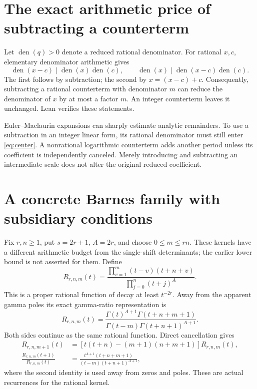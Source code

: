 \documentclass[11pt]{article}
\begin{document}
\section{The exact arithmetic price of subtracting a counterterm}
Let $\operatorname{den}(q)>0$ denote a reduced rational denominator.
For rational $x,c$, elementary denominator arithmetic gives
\begin{equation}
 \operatorname{den}(x-c)\mid\operatorname{den}(x)\operatorname{den}(c),
 \qquad
 \operatorname{den}(x)\mid\operatorname{den}(x-c)\operatorname{den}(c).
 \label{eq:center}
\end{equation}
The first follows by subtraction; the second by $x=(x-c)+c$.
Consequently, subtracting a rational counterterm with denominator $m$
can reduce the denominator of $x$ by at most a factor $m$.
An integer counterterm leaves it unchanged. Lean verifies these statements.

Euler--Maclaurin expansions can sharply estimate analytic remainders.
To use a subtraction in an integer linear form, its rational denominator
must still enter \eqref{eq:center}. A nonrational logarithmic counterterm
adds another period unless its coefficient is independently canceled.
Merely introducing and subtracting an intermediate scale does not alter
the original reduced coefficient.

\section{A concrete Barnes family with subsidiary conditions}
Fix $r,n\ge1$, put $s=2r+1$, $A=2r$, and choose $0\le m\le rn$.
These kernels have a different arithmetic budget from the single-shift
determinants; the earlier lower bound is not asserted for them. Define
\begin{equation}
 R_{r,n,m}(t)=
 \frac{\prod_{v=1}^{m}(t-v)(t+n+v)}
      {\prod_{j=0}^{n}(t+j)^A}.
 \label{eq:kernel}
\end{equation}
This is a proper rational function of decay at least $t^{-2r}$.
Away from the apparent gamma poles its exact gamma-ratio representation is
\[
 R_{r,n,m}(t)=
 \frac{\Gamma(t)^{A+1}\Gamma(t+n+m+1)}
      {\Gamma(t-m)\Gamma(t+n+1)^{A+1}}.
\]
Both sides continue as the same rational function. Direct cancellation gives
\begin{align}
 R_{r,n,m+1}(t)&=
 [t(t+n)-(m+1)(n+m+1)]R_{r,n,m}(t),\\
 \frac{R_{r,n,m}(t+1)}{R_{r,n,m}(t)}
 &=\frac{t^{A+1}(t+n+m+1)}
         {(t-m)(t+n+1)^{A+1}},
 \label{eq:ratio}
\end{align}
where the second identity is used away from zeros and poles.
These are actual recurrences for the rational kernel.
\end{document}
